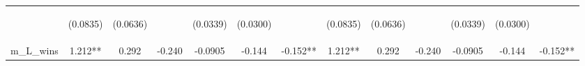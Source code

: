 \documentclass[]{article}
\begin{document}
\begin{center}
\begin{tabular}{lcccccccccccc}
\vspace{4pt} & \begin{footnotesize}(0.0835)\end{footnotesize} & \begin{footnotesize}(0.0636)\end{footnotesize} & \begin{footnotesize}\end{footnotesize} & \begin{footnotesize}(0.0339)\end{footnotesize} & \begin{footnotesize}(0.0300)\end{footnotesize} & \begin{footnotesize}\end{footnotesize} & \begin{footnotesize}(0.0835)\end{footnotesize} & \begin{footnotesize}(0.0636)\end{footnotesize} & \begin{footnotesize}\end{footnotesize} & \begin{footnotesize}(0.0339)\end{footnotesize} & \begin{footnotesize}(0.0300)\end{footnotesize} & \begin{footnotesize}\end{footnotesize} \\
m\_L\_wins & 1.212** & 0.292 & -0.240 & -0.0905 & -0.144 & -0.152** & 1.212** & 0.292 & -0.240 & -0.0905 & -0.144 & -0.152** \\

\end{tabular}
\end{center}
\end{document}
